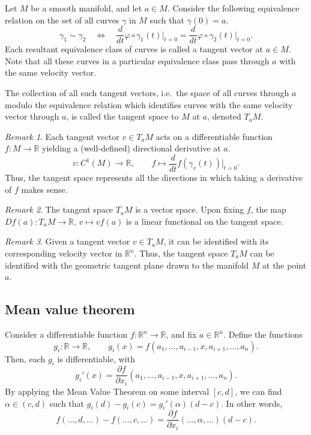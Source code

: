 \documentclass[11pt]{article}
\newcommand{\R}{\mathbb{R}}
\newcommand{\dd}[2]{\frac{d #1}{d #2}}
\newcommand{\pp}[2]{\frac{\partial #1}{\partial #2}}
\theoremstyle{definition}
\theoremstyle{remark}
\newtheorem*{remark}{Remark}
\numberwithin{equation}{section}
\begin{document}
    \begin{definition}
        Let $M$ be a smooth manifold, and let $a \in M$. Consider the following
        equivalence relation on the set of all curves $\gamma$ in $M$ such that
        $\gamma(0) = a$. \[
            \gamma_1 \sim \gamma_2 \quad\Longleftrightarrow\quad \dd{}{t} \varphi\circ
            \gamma_1(t)\Big|_{t = 0} = \dd{}{t} \varphi\circ \gamma_2(t)\Big|_{t =
            0}.
        \] Each resultant equivalence class of curves is called a tangent vector at
        $a \in M$. Note that all these curves in a particular equivalence class pass
        through $a$ with the same velocity vector.

        The collection of all such tangent vectors, i.e.\ the space of all curves
        through $a$ modulo the equivalence relation which identifies curves with the
        same velocity vector through $a$, is called the tangent space to $M$ at $a$,
        denoted $T_aM$.

        \begin{remark}
            Each tangent vector $v\in T_aM$ acts on a differentiable function
            $f\colon M \to \R$ yielding a (well-defined) directional derivative at
            $a$. \[
                v\colon C^1(M) \to \R, \qquad f\mapsto \dd{}{t}
                f(\gamma_v(t))\Big|_{t = 0}.
            \]
            Thus, the tangent space represents all the directions in which taking a
            derivative of $f$ makes sense.
        \end{remark}
        \begin{remark}
            The tangent space $T_aM$ is a vector space. Upon fixing $f$, the map
            $Df(a)\colon T_aM \to \R$, $v \mapsto vf(a)$ is a linear functional on
            the tangent space.
        \end{remark}
        \begin{remark}
            Given a tangent vector $v \in T_aM$, it can be identified with its
            corresponding velocity vector in $\R^n$. Thus, the tangent space $T_aM$
            can be identified with the geometric tangent plane drawn to the manifold
            $M$ at the point $a$.
        \end{remark}
    \end{definition}
    

    \subsection{Mean value theorem}
    Consider a differentiable function $f\colon \R^n \to \R$, and fix $a \in \R^n$.
    Define the functions \[
        g_i\colon \R \to \R, \qquad g_i(x) = f(a_1, \dots, a_{i - 1}, x, a_{i + 1},
        \dots, a_n).
    \] Then, each $g_i$ is differentiable, with \[
        g_i'(x) = \pp{f}{x_i}(a_1, \dots, a_{i - 1}, x, a_{i + 1}, \dots, a_n).
    \] By applying the Mean Value Theorem on some interval $[c, d]$, we can find
    $\alpha \in (c, d)$ such that $g_i(d) - g_i(c) = g_i'(\alpha)(d - c)$. In other
    words,
    \[
        f(\dots, d, \dots) - f(\dots, c, \dots) = \pp{f}{x_i}(\dots, \alpha, \dots)(d
        - c).
    \] 
\end{document}
